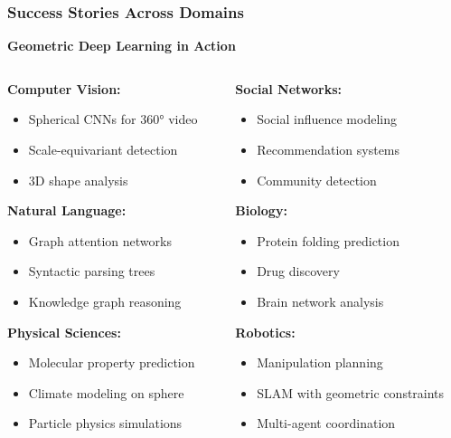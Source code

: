 \begin{frame}[fragile]\frametitle{Success Stories Across Domains}

\begin{center}
\textbf{Geometric Deep Learning in Action}
\end{center}

\begin{columns}
\begin{column}{0.5\textwidth}
\textbf{Computer Vision:}
\begin{itemize}
\item Spherical CNNs for 360° video
\item Scale-equivariant detection
\item 3D shape analysis
\end{itemize}

\textbf{Natural Language:}
\begin{itemize}
\item Graph attention networks
\item Syntactic parsing trees
\item Knowledge graph reasoning
\end{itemize}

\textbf{Physical Sciences:}
\begin{itemize}
\item Molecular property prediction
\item Climate modeling on sphere
\item Particle physics simulations
\end{itemize}
\end{column}
\begin{column}{0.5\textwidth}
\textbf{Social Networks:}
\begin{itemize}
\item Social influence modeling
\item Recommendation systems
\item Community detection
\end{itemize}

\textbf{Biology:}
\begin{itemize}
\item Protein folding prediction
\item Drug discovery
\item Brain network analysis
\end{itemize}

\textbf{Robotics:}
\begin{itemize}
\item Manipulation planning
\item SLAM with geometric constraints
\item Multi-agent coordination
\end{itemize}
\end{column}
\end{columns}


\end{frame}
